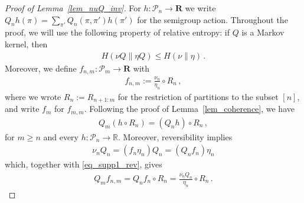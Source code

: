 \documentclass[a4paper,11pt]{article}
\newcommand{\RR}{\mathbf{R}}
\newcommand{\mP}{\mathcal{P}}
\numberwithin{equation}{section}
\begin{document}
\begin{proof}[Proof of Lemma~\ref{lem_nuQ_inv}]
For $ h: \mP_{n} \to \RR$ we write $ Q_{n}h ( \pi) = \sum_{\pi' } Q_{n}(\pi, \pi' ) h ( \pi')$ for the semigroup action. Throughout the proof, we will use the following property of relative entropy: if $Q$ is a Markov kernel, then 
\begin{equation}\label{eq_dataprocessing}
\begin{aligned}
H( \nu Q \| \eta Q  ) \leqslant H ( \nu \| \eta)\,. 
\end{aligned}
\end{equation}
Moreover, we define $f_{n,m} : \mP_{m} \to \RR$ with
\begin{equation*}
\begin{aligned}
f_{n,m}  := \frac{\nu_{n}}{ \eta_{n}} \circ R_{n}\,,
\end{aligned}
\end{equation*}
where we wrote  $ R_{n}:= R_{n+1:m}$ for the restriction of partitions to the subset $[n]$,
and write $ f_{m}$ for $ f_{m,m}$.
Following the proof of Lemma~\ref{lem_coherence},
we have
\begin{equation}\label{eq_supp1_rev}
\begin{aligned}
Q_m(h\circ R_n)=(Q_nh)\circ R_n\,,
\end{aligned}
\end{equation}
for $m\ge n$ and every $h:\mathcal P_n\to\mathbb R$.
Moreover, reversibility implies
\begin{equation}\label{eq_revers}
\begin{aligned}
\nu_{n} Q_{n}= ( f_{n} \eta_{n})Q_{n}=( Q_{n}f_{n})\eta_{n} 
\end{aligned}
\end{equation}
which, together with \eqref{eq_supp1_rev}, gives
\begin{equation}\label{eq_rev}
\begin{aligned}
Q_{m} f_{n,m}
= Q_{n} f_{n} \circ R_{n}
= \frac{\nu_{n}Q_{n}}{ \eta_{n}} \circ R_{n}\,.
\end{aligned}
\end{equation}



\end{proof}
\end{document}

